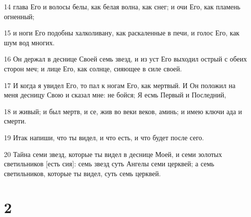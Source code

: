 \par 14 глава Его и волосы белы, как белая волна, как снег; и очи Его, как пламень огненный;
\par 15 и ноги Его подобны халколивану, как раскаленные в печи, и голос Его, как шум вод многих.
\par 16 Он держал в деснице Своей семь звезд, и из уст Его выходил острый с обеих сторон меч; и лице Его, как солнце, сияющее в силе своей.
\par 17 И когда я увидел Его, то пал к ногам Его, как мертвый. И Он положил на меня десницу Свою и сказал мне: не бойся; Я есмь Первый и Последний,
\par 18 и живый; и был мертв, и се, жив во веки веков, аминь; и имею ключи ада и смерти.
\par 19 Итак напиши, что ты видел, и что есть, и что будет после сего.
\par 20 Тайна семи звезд, которые ты видел в деснице Моей, и семи золотых светильников [есть сия]: семь звезд суть Ангелы семи церквей; а семь светильников, которые ты видел, суть семь церквей.

\chapter{2}

